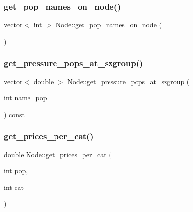 \mbox{\label{class_node_a3c31783e7f69f7338be5aab52ab10f4d}} 
\subsubsection{\texorpdfstring{get\_pop\_names\_on\_node()}{get\_pop\_names\_on\_node()}}
{\footnotesize\ttfamily vector$<$ int $>$ Node\+::get\+\_\+pop\+\_\+names\+\_\+on\+\_\+node (\begin{DoxyParamCaption}{ }\end{DoxyParamCaption})}

\mbox{\label{class_node_a92795b1420da105e9a3e7fb93676f4f4}} 
\subsubsection{\texorpdfstring{get\_pressure\_pops\_at\_szgroup()}{get\_pressure\_pops\_at\_szgroup()}}
{\footnotesize\ttfamily vector$<$ double $>$ Node\+::get\+\_\+pressure\+\_\+pops\+\_\+at\+\_\+szgroup (\begin{DoxyParamCaption}\item[{int}]{name\+\_\+pop }\end{DoxyParamCaption}) const}

\mbox{\label{class_node_ab6ef20b380f13109c31d1e4635c1c100}} 
\subsubsection{\texorpdfstring{get\_prices\_per\_cat()}{get\_prices\_per\_cat()}}
{\footnotesize\ttfamily double Node\+::get\+\_\+prices\+\_\+per\+\_\+cat (\begin{DoxyParamCaption}\item[{int}]{pop,  }\item[{int}]{cat }\end{DoxyParamCaption})\hspace{0.3cm}{\ttfamily [virtual]}}



